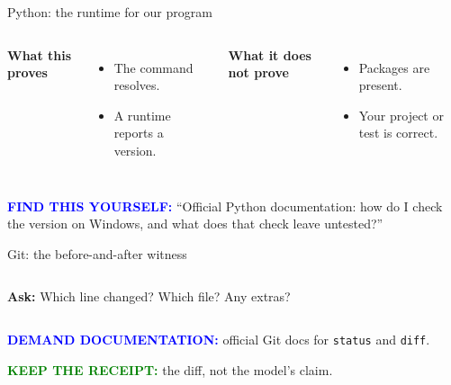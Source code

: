 \documentclass[aspectratio=169,11pt]{beamer}
\begin{document}
\begin{frame}{Python: the runtime for our program}\begin{columns}[T]\textbf{What this proves}\begin{itemize}\item The command resolves.\item A runtime reports a version.\end{itemize}\textbf{What it does not prove}\begin{itemize}\item Packages are present.\item Your project or test is correct.\end{itemize}\end{columns}\vfill\textcolor{blue}{\textbf{FIND THIS YOURSELF:}} “Official Python documentation: how do I check the version on Windows, and what does that check leave untested?”\end{frame}
\begin{frame}{Git: the before-and-after witness}\begin{columns}[T]\par\vspace{.3cm}\textbf{Ask:} Which line changed? Which file? Any extras?\end{columns}\vfill\textcolor{blue}{\textbf{DEMAND DOCUMENTATION:}} official Git docs for \texttt{status} and \texttt{diff}.\par\textcolor{green}{\textbf{KEEP THE RECEIPT:}} the diff, not the model's claim.\end{frame}
\end{document}
